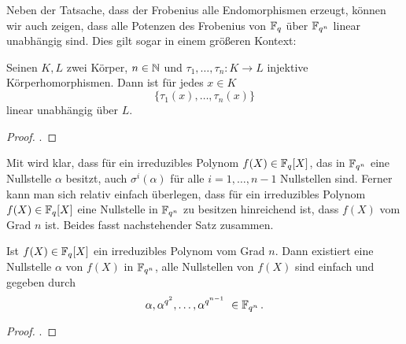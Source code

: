 Neben der Tatsache, dass der Frobenius alle Endomorphismen erzeugt, können wir
auch zeigen, dass alle Potenzen des Frobenius von $\mathbb{F}_q$ über $\mathbb{F}_{q^n}$ linear
unabhängig sind. Dies gilt sogar in einem größeren Kontext:

\begin{satz}
  \label{satz:dedekindsches_lemma}
  Seinen $K,L$ zwei Körper, $n \in \mathbb{N}$ und $\tau_1,\ldots,\tau_n: K\to L$
  injektive Körperhomorphismen. Dann ist für jedes $x \in K$
  \[ \{\tau_1(x),\ldots,\tau_n(x) \}\]
  linear unabhängig über $L$.
\end{satz}
\begin{proof}
  \autocite[Satz 27.2]{karpfinger2010algebra}.
\end{proof}


Mit  wird klar, dass für ein
irreduzibles Polynom $f(X) \in \mathbb{F}_q[X]$, das in $\mathbb{F}_{q^n}$ eine Nullstelle 
$\alpha$ besitzt, auch $\sigma^i(\alpha)$ für alle $i=1,\ldots,n-1$
Nullstellen sind. 
Ferner kann man sich relativ einfach überlegen, dass
für ein irreduzibles Polynom $f(X)\in \mathbb{F}_q[X]$ eine Nullstelle 
in $\mathbb{F}_{q^n}$ zu besitzen hinreichend ist, dass $f(X)$ vom Grad $n$ ist. 
Beides fasst nachstehender Satz zusammen.

\begin{satz}
  \label{satz:nst_irred_polys}
  Ist $f(X) \in \mathbb{F}_q[X]$ ein irreduzibles Polynom vom Grad $n$. Dann 
  existiert eine Nullstelle $\alpha$ von $f(X)$ in $\mathbb{F}_{q^n}$, alle 
  Nullstellen von $f(X)$ sind einfach und gegeben durch
  \[ \alpha, \alpha^{q^2}, \ldots, \alpha^{q^{n-1}}\ \in \mathbb{F}_{q^n}\,.\]
\end{satz}
\begin{proof}
  \autocite[Theorem 2.14]{lidl1997finite}.
\end{proof}

